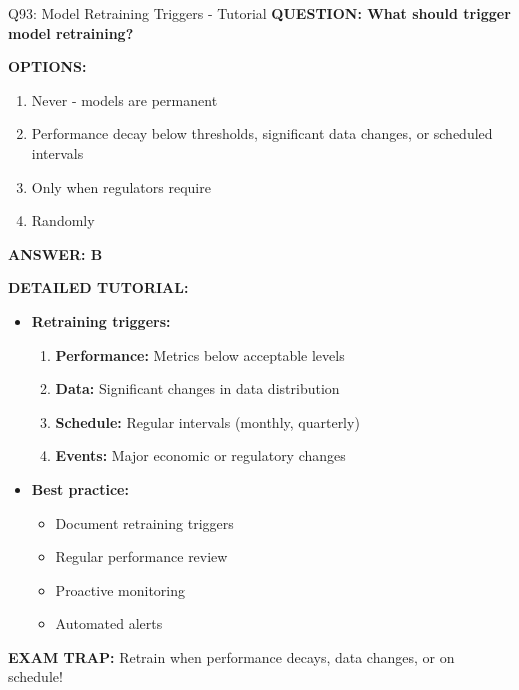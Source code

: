 \documentclass[8pt]{beamer}
\begin{document}
\begin{frame}{Q93: Model Retraining Triggers - Tutorial}
	\fontsize{6.5}{7.5}\selectfont
	\textbf{QUESTION: What should trigger model retraining?}
	
	\vspace{0.1cm}
	\textbf{OPTIONS:}
	\begin{enumerate}
		\item Never - models are permanent
		\item Performance decay below thresholds, significant data changes, or scheduled intervals
		\item Only when regulators require
		\item Randomly
	\end{enumerate}
	
	\vspace{0.1cm}
	\textcolor{myblue}{\textbf{ANSWER: B}}
	
	\vspace{0.1cm}
	\textbf{DETAILED TUTORIAL:}
	\begin{itemize}
		\item \textbf{Retraining triggers:}
		\begin{enumerate}
			\item \textbf{Performance:} Metrics below acceptable levels
			\item \textbf{Data:} Significant changes in data distribution
			\item \textbf{Schedule:} Regular intervals (monthly, quarterly)
			\item \textbf{Events:} Major economic or regulatory changes
		\end{enumerate}
		\item \textbf{Best practice:}
		\begin{itemize}
			\item Document retraining triggers
			\item Regular performance review
			\item Proactive monitoring
			\item Automated alerts
		\end{itemize}
	\end{itemize}
	
	\textcolor{myred}{\textbf{EXAM TRAP:}} Retrain when \textcolor{myblue}{performance decays, data changes, or on schedule}!
\end{frame}
\end{document}
